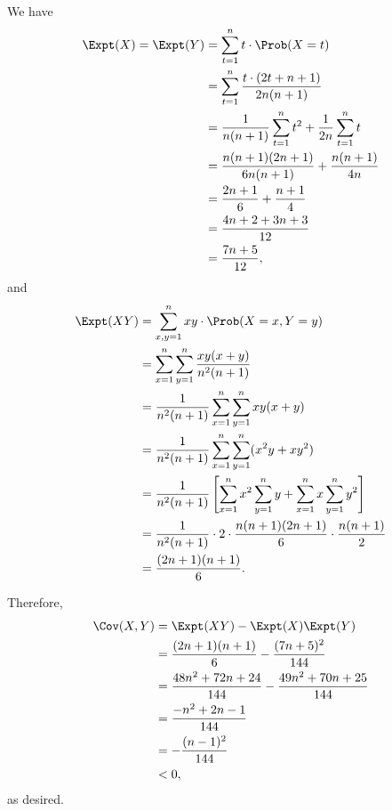 \begin{enumerate}
    We have
    \begin{align*}
        \Expt(X) = \Expt(Y) &= \sum_{t = 1}^{n} t \cdot \Prob(X = t)\\
        &= \sum_{t = 1}^{n} \frac{t \cdot (2t + n + 1)}{2n(n+1)}\\
        &= \frac{1}{n(n+1)} \sum_{t = 1}^{n} t^2 + \frac{1}{2n} \sum_{t = 1}^{n} t\\
        &= \frac{n(n+1)(2n+1)}{6n(n+1)} + \frac{n(n+1)}{4n}\\
        &= \frac{2n+1}{6} + \frac{n+1}{4}\\
        &= \frac{4n+2+3n+3}{12}\\
        &= \frac{7n+5}{12},
    \end{align*}
    and
    \begin{align*}
        \Expt(XY) &= \sum_{x, y = 1}^{n} xy \cdot \Prob(X = x, Y = y)\\
        &= \sum_{x = 1}^{n} \sum_{y = 1}^{n} \frac{xy(x + y)}{n^2(n+1)}\\
        &= \frac{1}{n^2(n+1)} \sum_{x = 1}^{n} \sum_{y = 1}^{n} xy(x + y)\\
        &= \frac{1}{n^2(n+1)} \sum_{x = 1}^{n} \sum_{y = 1}^{n} (x^2y + xy^2)\\
        &= \frac{1}{n^2(n+1)} \left[\sum_{x = 1}^{n} x^2 \sum_{y = 1}^{n} y + \sum_{x = 1}^{n} x \sum_{y = 1}^{n} y^2\right]\\
        &= \frac{1}{n^2(n+1)} \cdot 2 \cdot \frac{n(n+1)(2n+1)}{6} \cdot \frac{n(n+1)}{2}\\
        &= \frac{(2n+1)(n+1)}{6}.
    \end{align*}

    Therefore,
    \begin{align*}
        \Cov(X, Y) &= \Expt(XY) - \Expt(X)\Expt(Y)\\
        &= \frac{(2n+1)(n+1)}{6} - \frac{(7n+5)^2}{144}\\
        &= \frac{48n^2 + 72n + 24}{144} - \frac{49n^2 + 70n + 25}{144}\\
        &= \frac{-n^2 + 2n - 1}{144}\\
        &= -\frac{(n-1)^2}{144}\\
        &< 0,
    \end{align*}
    as desired.
\end{enumerate}